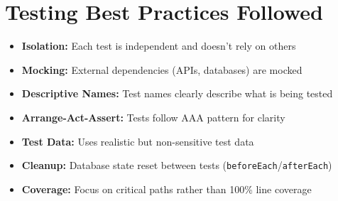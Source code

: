 \section{Testing Best Practices Followed}
\label{sec:testing_best_practices}

\begin{itemize}
    \item \textbf{Isolation:} Each test is independent and doesn't rely on others
    \item \textbf{Mocking:} External dependencies (APIs, databases) are mocked
    \item \textbf{Descriptive Names:} Test names clearly describe what is being tested
    \item \textbf{Arrange-Act-Assert:} Tests follow AAA pattern for clarity
    \item \textbf{Test Data:} Uses realistic but non-sensitive test data
    \item \textbf{Cleanup:} Database state reset between tests (\texttt{beforeEach}/\texttt{afterEach})
    \item \textbf{Coverage:} Focus on critical paths rather than 100\% line coverage
\end{itemize}
